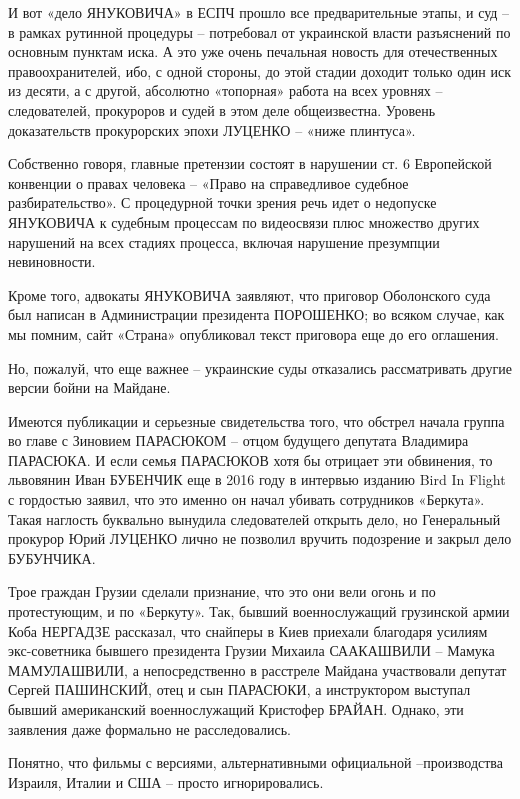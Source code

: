 И вот «дело ЯНУКОВИЧА» в ЕСПЧ прошло все предварительные этапы, и суд – в
рамках рутинной процедуры – потребовал от украинской власти разъяснений по
основным пунктам иска. А это уже очень печальная новость для отечественных
правоохранителей, ибо, с одной стороны, до этой стадии доходит только один иск
из десяти, а с другой, абсолютно «топорная» работа на всех уровнях –
следователей, прокуроров и судей в этом деле общеизвестна. Уровень
доказательств прокурорских эпохи ЛУЦЕНКО – «ниже плинтуса».  

Собственно говоря, главные претензии состоят в нарушении ст. 6 Европейской
конвенции о правах человека – «Право на справедливое судебное разбирательство».
С процедурной точки зрения речь идет о недопуске ЯНУКОВИЧА к судебным процессам
по видеосвязи плюс множество других нарушений на всех стадиях процесса, включая
нарушение презумпции невиновности. 

Кроме того, адвокаты ЯНУКОВИЧА заявляют, что приговор Оболонского суда был
написан в Администрации президента ПОРОШЕНКО; во всяком случае, как мы помним,
сайт «Страна» опубликовал текст приговора еще до его оглашения. 

Но, пожалуй, что еще важнее – украинские суды отказались рассматривать другие
версии бойни на Майдане. 

Имеются публикации и серьезные свидетельства того, что обстрел начала группа во
главе с Зиновием ПАРАСЮКОМ – отцом будущего депутата Владимира ПАРАСЮКА. И если
семья ПАРАСЮКОВ хотя бы отрицает эти обвинения, то львовянин Иван БУБЕНЧИК еще
в 2016 году в интервью изданию Bird In Flight с гордостью заявил, что это
именно он начал убивать сотрудников «Беркута». Такая наглость буквально
вынудила следователей открыть дело, но Генеральный прокурор Юрий ЛУЦЕНКО лично
не позволил вручить подозрение и закрыл дело БУБУНЧИКА.

Трое граждан Грузии сделали признание, что это они вели огонь и по
протестующим, и по «Беркуту». Так, бывший военнослужащий грузинской армии Коба
НЕРГАДЗЕ рассказал, что снайперы в Киев приехали благодаря усилиям
экс-советника бывшего президента Грузии Михаила СААКАШВИЛИ – Мамука
МАМУЛАШВИЛИ, а непосредственно в расстреле Майдана участвовали депутат Сергей
ПАШИНСКИЙ, отец и сын ПАРАСЮКИ, а инструктором выступал бывший американский
военнослужащий Кристофер БРАЙАН. Однако, эти заявления даже формально не
расследовались.

Понятно, что фильмы с версиями, альтернативными официальной –производства
Израиля, Италии и США – просто игнорировались. 

